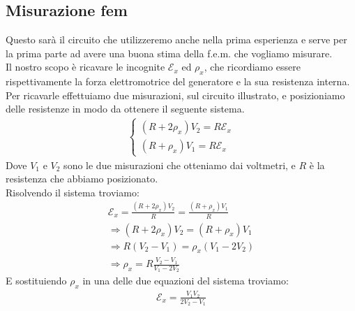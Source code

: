 \documentclass[a4paper, oneside]{article}
\newcommand{\E}{\mathcal{E}}
\begin{document}
    \subsection{Misurazione fem}
    \begin{figure}
    \end{figure}
    Questo sarà il circuito che utilizzeremo anche nella prima esperienza e serve per la prima parte ad avere una buona stima della f.e.m. che vogliamo misurare.\\
    Il nostro scopo è ricavare le incognite $\E_x$ ed $\rho_x$, che ricordiamo essere rispettivamente la forza elettromotrice del generatore e la sua resistenza interna.\\
    Per ricavarle effettuiamo due misurazioni, sul circuito illustrato, e posizioniamo delle resistenze in modo da ottenere il seguente sistema.
    \begin{gather*}
        \begin{cases}
            (R + 2\rho_x) V_2 = R \E_x\\
            (R + \rho_x) V_1 = R \E_x
        \end{cases}
    \end{gather*}
    Dove $V_1$ e $V_2$ sono le due misurazioni che otteniamo dai voltmetri, e $R$ è la resistenza che abbiamo posizionato.\\
    Risolvendo il sistema troviamo:
    \begin{gather*}
        \E_x = \frac{(R + 2\rho_x) V_2}{R} = \frac{(R + \rho_x) V_1}{R} \\
        \Rightarrow (R + 2\rho_x) V_2 = (R + \rho_x) V_1 \\
        \Rightarrow R (V_2 - V_1) = \rho_x (V_1 - 2 V_2) \\
        \Rightarrow \rho_x = R \frac{V_2 - V_1}{V_1 - 2 V_2}
    \end{gather*}
    E sostituiendo $\rho_x$ in una delle due equazioni del sistema troviamo:
    \begin{gather*}
        \E_x = \frac{V_1 V_2}{2V_2 -V_1}
    \end{gather*}
    \hfill\\\hfill\\
\end{document}
